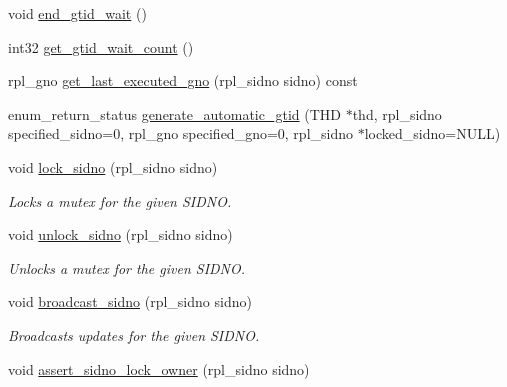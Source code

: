 \begin{DoxyCompactItemize}
\item 
void \mbox{\hyperlink{classGtid__state_a4b849b9b07629619b77882ddb5fde5ac}{end\+\_\+gtid\+\_\+wait}} ()
\item 
int32 \mbox{\hyperlink{classGtid__state_a59586299cdb464b0378338eba646fb9c}{get\+\_\+gtid\+\_\+wait\+\_\+count}} ()
\item 
rpl\+\_\+gno \mbox{\hyperlink{classGtid__state_ad58b3ccada19a67f2b8b5f690d08a309}{get\+\_\+last\+\_\+executed\+\_\+gno}} (rpl\+\_\+sidno sidno) const
\item 
enum\+\_\+return\+\_\+status \mbox{\hyperlink{classGtid__state_abdb617d2a570ff813a950b3aceefb22e}{generate\+\_\+automatic\+\_\+gtid}} (T\+HD $\ast$thd, rpl\+\_\+sidno specified\+\_\+sidno=0, rpl\+\_\+gno specified\+\_\+gno=0, rpl\+\_\+sidno $\ast$locked\+\_\+sidno=N\+U\+LL)
\item 
\mbox{\label{classGtid__state_ac3d84b821f0021c098306971c6cc75a6}} 
void \mbox{\hyperlink{classGtid__state_ac3d84b821f0021c098306971c6cc75a6}{lock\+\_\+sidno}} (rpl\+\_\+sidno sidno)
\begin{DoxyCompactList}\small\item\em Locks a mutex for the given S\+I\+D\+NO. \end{DoxyCompactList}\item 
\mbox{\label{classGtid__state_aa28f4660564a239c4e538b86dce1f832}} 
void \mbox{\hyperlink{classGtid__state_aa28f4660564a239c4e538b86dce1f832}{unlock\+\_\+sidno}} (rpl\+\_\+sidno sidno)
\begin{DoxyCompactList}\small\item\em Unlocks a mutex for the given S\+I\+D\+NO. \end{DoxyCompactList}\item 
\mbox{\label{classGtid__state_ae8e2deb3fdc80fcb1931bc422f8382ad}} 
void \mbox{\hyperlink{classGtid__state_ae8e2deb3fdc80fcb1931bc422f8382ad}{broadcast\+\_\+sidno}} (rpl\+\_\+sidno sidno)
\begin{DoxyCompactList}\small\item\em Broadcasts updates for the given S\+I\+D\+NO. \end{DoxyCompactList}\item 
\mbox{\label{classGtid__state_a9a3acb3b64327c2a5ce389a04a8ba026}} 
void \mbox{\hyperlink{classGtid__state_a9a3acb3b64327c2a5ce389a04a8ba026}{assert\+\_\+sidno\+\_\+lock\+\_\+owner}} (rpl\+\_\+sidno sidno)

\end{DoxyCompactItemize}
